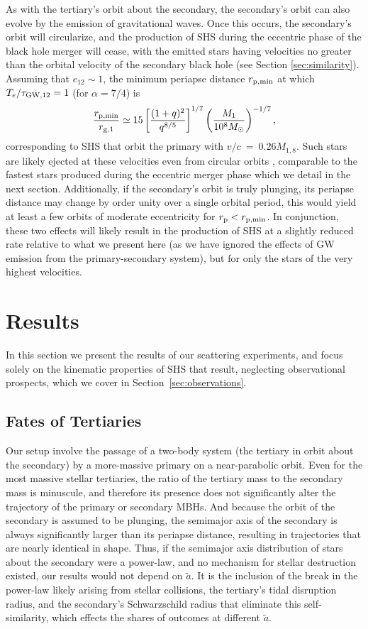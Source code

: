\documentclass[a4paper,twocolumn]{emulateapj}
\begin{document}
{As with the tertiary's orbit about the secondary, the secondary's orbit can also evolve by the emission of gravitational waves. Once this occurs, the secondary's orbit will circularize, and the production of SHS during the eccentric phase of the black hole merger will cease, with the emitted stars having velocities no greater than the orbital velocity of the secondary black hole (see Section \ref{sec:similarity}). Assuming that $e_{12} \sim 1$, the minimum periapse distance $r_{\rm p,\min}$ at which $T_{e}/\tau_{\rm GW,12} = 1$ (for $\alpha = 7/4$) is
\begin{equation}
\frac{r_{\rm p,\min}}{r_{\rm g,1}} \simeq 15 \left[\frac{(1+q)^2}{q^{8/5}}\right]^{1/7} \left(\frac{M_1}{10^8 M_\odot}\right)^{-1/7},
\end{equation}
corresponding to SHS that orbit the primary with $v/c~=~0.26 M_{1,8}$. Such stars are likely ejected at these velocities even from circular orbits \citep{Sesana:2006a}, comparable to the fastest stars produced during the eccentric merger phase which we detail in the next section. Additionally, if the secondary's orbit is truly plunging, its periapse distance may change by order unity over a single orbital period, this would yield at least a few orbits of moderate eccentricity for $r_{\rm p} < r_{\rm p,\min}$. In conjunction, these two effects will likely result in the production of SHS at a slightly reduced rate relative to what we present here (as we have ignored the effects of GW emission from the primary-secondary system), but for only the stars of the very highest velocities.

\section{Results}\label{sec:results}
In this section we present the results of our scattering experiments, and focus solely on the kinematic properties of SHS that result, neglecting observational prospects, which we cover in Section~\ref{sec:observations}.

\subsection{Fates of Tertiaries}
Our setup involve the passage of a two-body system (the tertiary in orbit about the secondary) by a more-massive primary on a near-parabolic orbit. Even for the most massive stellar tertiaries, the ratio of the tertiary mass to the secondary mass is minuscule, and therefore its presence does not significantly alter the trajectory of the primary or secondary MBHs. And because the orbit of the secondary is assumed to be plunging, the semimajor axis of the secondary is always significantly larger than its periapse distance, resulting in trajectories that are nearly identical in shape. Thus, if the semimajor axis distribution of stars about the secondary were a power-law, and no mechanism for stellar destruction existed, our results would not depend on $\tilde{a}$. It is the inclusion of the break in the power-law likely arising from stellar collisions, the tertiary's tidal disruption radius, and the secondary's Schwarzschild radius that eliminate this self-similarity, which effects the shares of outcomes at different $\tilde{a}$.

}
\end{document}

